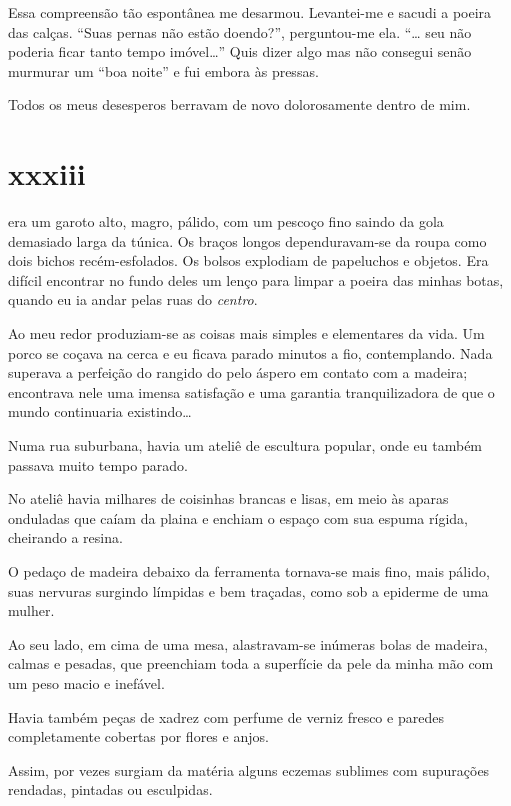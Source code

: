 Essa compreensão tão espontânea me desarmou. Levantei-me e sacudi a poeira das
calças. ``Suas pernas não estão doendo?'', perguntou-me ela. ``\ldots{} seu
não poderia ficar tanto tempo imóvel\ldots{}'' Quis dizer algo mas não
consegui senão murmurar um ``boa noite'' e fui embora às pressas.

Todos os meus desesperos berravam de novo dolorosamente dentro de mim.


\section{xxxiii} 

 era um garoto alto, magro, pálido, com um pescoço fino saindo da
 gola demasiado larga da túnica. Os braços longos dependuravam-se da roupa
 como dois bichos recém-esfolados. Os bolsos explodiam de papeluchos e
 objetos. Era difícil encontrar no fundo deles um lenço para limpar a poeira
 das minhas botas, quando eu ia andar pelas ruas do \textit{centro}.

Ao meu redor produziam-se as coisas mais simples e elementares da vida. Um
porco se coçava na cerca e eu ficava parado minutos a fio, contemplando. Nada
superava a perfeição do rangido do pelo áspero em contato com a madeira;
encontrava nele uma imensa satisfação e uma garantia tranquilizadora de que o
mundo continuaria existindo\ldots{}

Numa rua suburbana, havia um ateliê de escultura popular, onde eu também
passava muito tempo parado.

No ateliê havia milhares de coisinhas brancas e lisas, em meio às aparas
onduladas que caíam da plaina e enchiam o espaço com sua espuma rígida,
cheirando a resina.

O pedaço de madeira debaixo da ferramenta tornava-se mais fino, mais pálido,
suas nervuras surgindo límpidas e bem traçadas, como sob a epiderme de uma
mulher. 

Ao seu lado, em cima de uma mesa, alastravam-se inúmeras bolas de madeira,
calmas e pesadas, que preenchiam toda a superfície da pele da minha mão com
um peso macio e inefável.

Havia também peças de xadrez com perfume de verniz fresco e paredes
completamente cobertas por flores e anjos.

Assim, por vezes surgiam da matéria alguns eczemas sublimes com supurações
rendadas, pintadas ou esculpidas.


